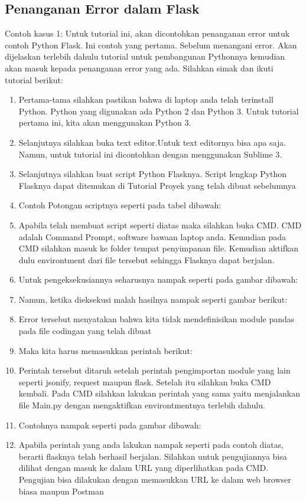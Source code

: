 \subsection{Penanganan Error dalam Flask}

Contoh kasus 1: Untuk tutorial ini, akan dicontohkan penanganan error untuk contoh Python Flask. Ini contoh yang pertama. Sebelum menangani error. Akan dijelaskan terlebih dahulu tutorial untuk pembangunan Pythonnya kemudian akan masuk kepada penanganan error yang ada. Silahkan simak dan ikuti tutorial berikut:
\begin{enumerate}
\item Pertama-tama silahkan pastikan bahwa di laptop anda telah terinstall Python. Python yang digunakan ada Python 2 dan Python 3. Untuk tutorial pertama ini, kita akan menggunakan Python 3.
\item Selanjutnya silahkan buka text editor.Untuk text editornya bisa apa saja. Namun, untuk tutorial ini dicontohkan dengan menggunakan Sublime 3.
\item Selanjutnya silahkan buat script Python Flasknya. Script lengkap Python Flasknya dapat ditemukan di Tutorial Proyek yang telah dibuat sebelumnya 
\item Contoh Potongan scriptnya seperti pada tabel dibawah:
\item Apabila telah membuat script seperti diatas maka silahkan buka CMD. CMD adalah Command Prompt, software bawaan laptop anda. Kemudian pada CMD silahkan masuk ke folder tempat penyimpanan file. Kemudian aktifkan dulu environtment dari file tersebut sehingga Flasknya dapat berjalan.
\item Untuk pengeksekusiannya seharusnya nampak seperti pada gambar dibawah:
\item Namun, ketika dieksekusi malah hasilnya nampak seperti gambar berikut:
\item Error tersebut menyatakan bahwa kita tidak mendefinisikan module pandas pada file codingan yang telah dibuat
\item Maka kita harus memasukkan perintah berikut:
\item Perintah tersebut ditaruh setelah perintah pengimportan module yang lain seperti jsonify, request maupun flask. Setelah itu silahkan buka CMD kembali. Pada CMD silahkan lakukan perintah yang sama yaitu menjalankan file Main.py dengan mengaktifkan environtmentnya terlebih dahulu.
\item Contohnya nampak seperti pada gambar dibawah:
\item Apabila perintah yang anda lakukan nampak seperti pada contoh diatas, berarti flasknya telah berhasil berjalan. Silahkan untuk pengujiannya bisa dilihat dengan masuk ke dalam URL yang diperlihatkan pada CMD. Pengujian bisa dilakukan dengan memasukkan URL ke dalam web browser biasa maupun Postman

\end{enumerate}
